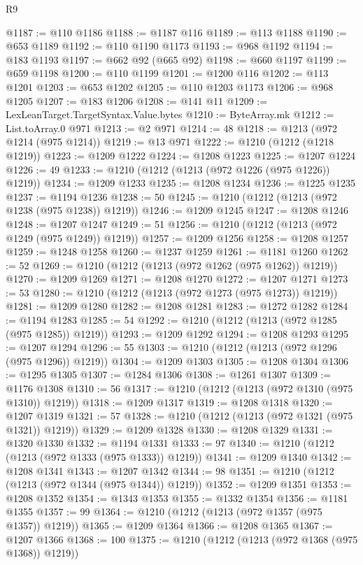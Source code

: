 \begin{lexlean}{R9}
\begin{coremodule}
@1187 := @110 @1186
@1188 := @1187 @116
@1189 := @113 @1188
@1190 := @653 @1189
@1192 := @110 @1190 @1173
@1193 := @968 @1192
@1194 := @183 @1193
@1197 := @662 @92 (@665 @92)
@1198 := @660 @1197
@1199 := @659 @1198
@1200 := @110 @1199
@1201 := @1200 @116
@1202 := @113 @1201
@1203 := @653 @1202
@1205 := @110 @1203 @1173
@1206 := @968 @1205
@1207 := @183 @1206
@1208 := @141 @11
@1209 := LexLeanTarget.TargetSyntax.Value.bytes
@1210 := ByteArray.mk
@1212 := List.toArray.{0} @971
@1213 := @2 @971
@1214 := 48
@1218 := @1213 (@972 @1214 (@975 @1214))
@1219 := @13 @971
@1222 := @1210 (@1212 (@1218 @1219))
@1223 := @1209 @1222
@1224 := @1208 @1223
@1225 := @1207 @1224
@1226 := 49
@1233 := @1210 (@1212 (@1213 (@972 @1226 (@975 @1226)) @1219))
@1234 := @1209 @1233
@1235 := @1208 @1234
@1236 := @1225 @1235
@1237 := @1194 @1236
@1238 := 50
@1245 := @1210 (@1212 (@1213 (@972 @1238 (@975 @1238)) @1219))
@1246 := @1209 @1245
@1247 := @1208 @1246
@1248 := @1207 @1247
@1249 := 51
@1256 := @1210 (@1212 (@1213 (@972 @1249 (@975 @1249)) @1219))
@1257 := @1209 @1256
@1258 := @1208 @1257
@1259 := @1248 @1258
@1260 := @1237 @1259
@1261 := @1181 @1260
@1262 := 52
@1269 := @1210 (@1212 (@1213 (@972 @1262 (@975 @1262)) @1219))
@1270 := @1209 @1269
@1271 := @1208 @1270
@1272 := @1207 @1271
@1273 := 53
@1280 := @1210 (@1212 (@1213 (@972 @1273 (@975 @1273)) @1219))
@1281 := @1209 @1280
@1282 := @1208 @1281
@1283 := @1272 @1282
@1284 := @1194 @1283
@1285 := 54
@1292 := @1210 (@1212 (@1213 (@972 @1285 (@975 @1285)) @1219))
@1293 := @1209 @1292
@1294 := @1208 @1293
@1295 := @1207 @1294
@1296 := 55
@1303 := @1210 (@1212 (@1213 (@972 @1296 (@975 @1296)) @1219))
@1304 := @1209 @1303
@1305 := @1208 @1304
@1306 := @1295 @1305
@1307 := @1284 @1306
@1308 := @1261 @1307
@1309 := @1176 @1308
@1310 := 56
@1317 := @1210 (@1212 (@1213 (@972 @1310 (@975 @1310)) @1219))
@1318 := @1209 @1317
@1319 := @1208 @1318
@1320 := @1207 @1319
@1321 := 57
@1328 := @1210 (@1212 (@1213 (@972 @1321 (@975 @1321)) @1219))
@1329 := @1209 @1328
@1330 := @1208 @1329
@1331 := @1320 @1330
@1332 := @1194 @1331
@1333 := 97
@1340 := @1210 (@1212 (@1213 (@972 @1333 (@975 @1333)) @1219))
@1341 := @1209 @1340
@1342 := @1208 @1341
@1343 := @1207 @1342
@1344 := 98
@1351 := @1210 (@1212 (@1213 (@972 @1344 (@975 @1344)) @1219))
@1352 := @1209 @1351
@1353 := @1208 @1352
@1354 := @1343 @1353
@1355 := @1332 @1354
@1356 := @1181 @1355
@1357 := 99
@1364 := @1210 (@1212 (@1213 (@972 @1357 (@975 @1357)) @1219))
@1365 := @1209 @1364
@1366 := @1208 @1365
@1367 := @1207 @1366
@1368 := 100
@1375 := @1210 (@1212 (@1213 (@972 @1368 (@975 @1368)) @1219))

\end{coremodule}
\end{lexlean}
